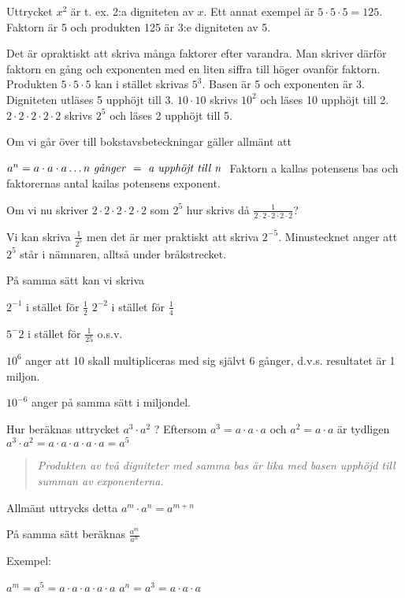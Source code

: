 Uttrycket $x^2$ är t. ex. 2:a digniteten av $x$.
Ett annat exempel är $5 \cdot 5 \cdot 5 = 125$.
Faktorn är 5 och produkten 125 är 3:e digniteten av 5.

Det är opraktiskt att skriva många faktorer efter varandra. Man skriver därför
faktorn en gång och exponenten med en liten siffra till höger ovanför faktorn.
Produkten $5 \cdot 5 \cdot 5$ kan i stället skrivas $5^3$.
Basen är 5 och exponenten är 3. Digniteten utläses 5 upphöjt till 3.
$10 \cdot 10$ skrivs $10^2$ och läses 10 upphöjt till 2.
$2 \cdot 2 \cdot 2 \cdot 2 \cdot 2$ skrivs $2^5$ och läses 2 upphöjt
till 5.

Om vi går över till bokstavsbeteckningar gäller allmänt att

$a^n= a \cdot a \cdot a \ldots n \textrm{ \emph{g{\aa}nger} } = \textrm{ \emph{a
  upphöjt till n} }$ 
Faktorn a kallas potensens bas och faktorernas antal kailas potensens exponent.

Om vi nu skriver $2 \cdot 2 \cdot 2 \cdot 2 \cdot 2$ som $2^5$ hur skrivs då
$\frac{1}{2 \cdot 2 \cdot 2 \cdot 2 \cdot 2}$?

Vi kan skriva $\frac{1}{2^5}$ men det är mer praktiskt att skriva $2^{-5}$.
Minustecknet anger att $2^5$ står i nämnaren, alltså under bråkstrecket.

På samma sätt kan vi skriva

$2^{-1}$ i stället för $\frac{1}{2}$ $2^{-2}$ i stället för $\frac{1}{4}$

$5^-2$ i stället för $\frac{1}{25}$ o.s.v.

$10^6$ anger att 10 skall multipliceras med sig självt 6 gånger, d.v.s.
resultatet är 1 miljon.

$10^{-6}$ anger på samma sätt i miljondel.

Hur beräknas uttrycket $a^3 \cdot a^2$ ?
Eftersom $a^3 = a \cdot a \cdot a$ och $a^2 = a \cdot a$ är tydligen
$a^3 \cdot a^2 = a \cdot a \cdot a \cdot a \cdot a = a^5$

\begin{quote}\emph{Produkten av två digniteter med samma bas är lika med basen upphöjd till summan av exponenterna.}\end{quote}

Allmänt uttrycks detta $a^m \cdot a^n = a^{m+n}$

På samma sätt beräknas $\frac{a^m}{a^n}$

Exempel:

$a^m = a^5 = a \cdot a \cdot a \cdot a \cdot a$
$a^n = a^3 = a \cdot a \cdot a$

